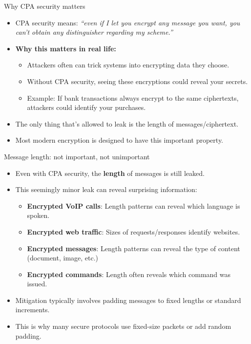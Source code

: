 \documentclass[aspectratio=169, lualatex, handout]{beamer}
\begin{document}
\begin{frame}{Why CPA security matters}
	\begin{itemize}
		\item CPA security means: \textit{``even if I let you encrypt any message you want, you can't obtain any distinguisher regarding my scheme.''}
		\item \textbf{Why this matters in real life:}
		      \begin{itemize}
			      \item Attackers often can trick systems into encrypting data they choose.
			      \item Without CPA security, seeing these encryptions could reveal your secrets.
			      \item Example: If bank transactions always encrypt to the same ciphertexts, attackers could identify your purchases.
		      \end{itemize}
		\item The only thing that's allowed to leak is the length of messages/ciphertext.
		\item Most modern encryption is designed to have this important property.
	\end{itemize}
\end{frame}

\begin{frame}{Message length: not important, not unimportant}
	\begin{itemize}
		\item Even with CPA security, the \textbf{length} of messages is still leaked.
		\item This seemingly minor leak can reveal surprising information:
		      \begin{itemize}
			      \item \textbf{Encrypted VoIP calls}: Length patterns can reveal which language is spoken.
			      \item \textbf{Encrypted web traffic}: Sizes of requests/responses identify websites.
			      \item \textbf{Encrypted messages}: Length patterns can reveal the type of content (document, image, etc.)
			      \item \textbf{Encrypted commands}: Length often reveals which command was issued.
		      \end{itemize}
		\item Mitigation typically involves padding messages to fixed lengths or standard increments.
		\item This is why many secure protocols use fixed-size packets or add random padding.
	\end{itemize}
\end{frame}
\end{document}
